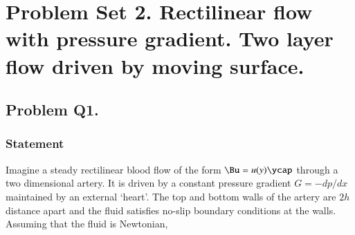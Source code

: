 %
%
%
%
%
%


\chapter{Problem Set 2.  Rectilinear flow with pressure gradient.  Two layer flow driven by moving surface.}
\label{chap:continuumProblemSet2}
\date{Mar 2, 2012}

\beginArtWithToc
%

\section{Problem Q1.}
\subsection{Statement}

Imagine a steady rectilinear blood flow of the form $\Bu = u(y) \ycap$ through a two dimensional artery.  It is driven by a constant pressure gradient $G = -dp/dx$ maintained by an external `heart'.  The top and bottom walls of the artery are $2h$ distance apart and the fluid satisfies no-slip boundary conditions at the walls.  Assuming that the fluid is Newtonian,

